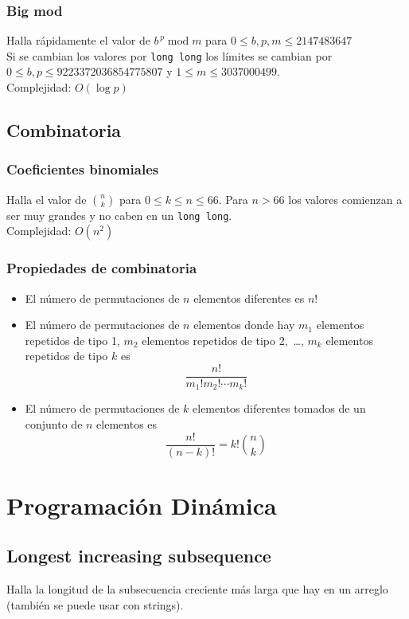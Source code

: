 \documentclass[10pt,letterpaper,twocolumn]{article}
\newcommand{\source}[1]{
  
  \dotfill
}
\begin{document}
    \subsubsection{Big mod}
    Halla rápidamente el valor de $b^{\,p} \operatorname{mod} m$ para $0 \leq b,p,m \leq 2147483647$\\
    Si se cambian los valores por \verb|long long| los límites se cambian por $0 \leq b,p \leq 9223372036854775807$ y $1 \leq m \leq 3037000499$.\\
    Complejidad: $O(\operatorname{log} p)$\\
    \source{./src/bigmod.cpp}

  \subsection{Combinatoria}
    \subsubsection{Coeficientes binomiales}
    Halla el valor de $\binom{n}{k}$ para $0 \leq k \leq n \leq 66$. Para $n > 66$ los valores comienzan a ser muy grandes y no caben en un \verb|long long|.\\
    Complejidad: $O(n^2)$\\
    \source{./src/binomial.cpp}

    \subsubsection{Propiedades de combinatoria}
    \begin{itemize}
      \item El número de permutaciones de $n$ elementos diferentes es $n!$
      \item El número de permutaciones de $n$ elementos donde hay $m_1$ elementos repetidos de tipo 1, $m_2$ elementos repetidos de tipo 2,~\ldots, $m_k$ elementos repetidos de tipo $k$ es $$\frac{n!}{m_1! m_2! \cdots m_k!} $$
      \item El número de permutaciones de $k$ elementos diferentes tomados de un conjunto de $n$ elementos es $$ \frac{n!}{(n-k)!} = k! \binom{n}{k}$$
    \end{itemize}

\section{Programación Dinámica}
  \subsection{Longest increasing subsequence}
    Halla la longitud de la subsecuencia creciente más larga que hay en un arreglo (también se puede usar con strings).
\end{document}
